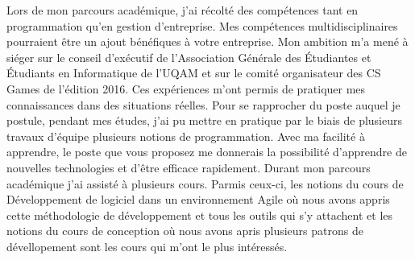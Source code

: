 \vfill
Lors de mon parcours académique, j'ai récolté des compétences tant en
programmation qu'en gestion d'entreprise. Mes compétences
multidisciplinaires pourraient être un ajout bénéfiques à votre entreprise. Mon
ambition m'a mené à siéger sur le conseil d'exécutif de l'Association
Générale des Étudiantes et Étudiants en Informatique de l'UQAM et sur le
comité organisateur des CS Games de l'édition 2016.
Ces expériences m'ont permis de pratiquer mes connaissances
dans des situations réelles.
\vfill
Pour se rapprocher du poste auquel je postule, pendant mes études,
j'ai pu mettre en pratique par le biais de
plusieurs travaux d'équipe plusieurs notions de programmation. Avec ma
facilité à apprendre, le poste que vous proposez me donnerais la possibilité
d'apprendre de nouvelles technologies et d'être efficace rapidement. Durant
mon parcours académique j'ai assisté à plusieurs cours. Parmis ceux-ci, les
notions du cours de Développement de logiciel dans un environnement Agile où
nous avons appris cette méthodologie de développement et tous les outils qui s'y
attachent et les notions du cours de conception où nous avons apris plusieurs
patrons de dévellopement sont les cours qui m'ont le plus intéressés.
